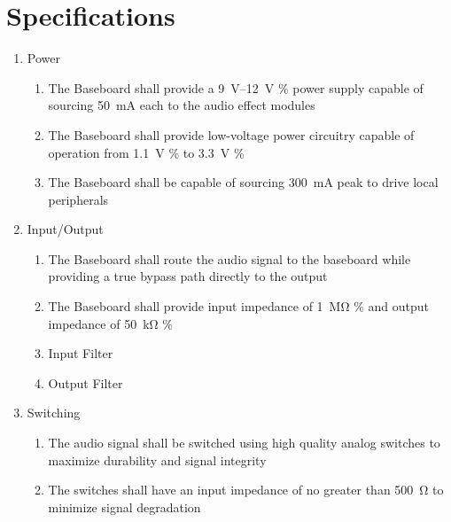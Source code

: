 \documentclass[12pt, titlepage]{tex-template}
\begin{document}
\section{Specifications}
\begin{enumerate}
    \item Power
          \begin{enumerate}
              \item The Baseboard shall provide a \qtyrange[range-units = single, range-phrase = --]{9}{12}{\volt} \% power supply capable of sourcing \pm \SI{50}{\milli\ampere} each to the audio effect modules
              \item The Baseboard shall provide low-voltage power circuitry capable of operation from \SI{1.1}{\volt} \% to \SI{3.3}{\volt} \%
              \item The Baseboard shall be capable of sourcing \SI{300}{\milli\ampere} peak to drive local peripherals
          \end{enumerate}
          \item{Input/Output}
          \begin{enumerate}
              \item The Baseboard shall route the audio signal to the baseboard while providing a true bypass path directly to the output
              \item The Baseboard shall provide input impedance of \SI{1}{\mega\ohm} \% and output impedance of \SI{50}{\kilo\ohm} \%
              \item Input Filter
              \item Output Filter
          \end{enumerate}
          \item{Switching}
          \begin{enumerate}
              \item The audio signal shall be switched using high quality analog switches to maximize durability and signal integrity
              \item The switches shall have an input impedance of no greater than \SI{500}{\ohm} to minimize signal degradation
          \end{enumerate}
\end{enumerate}
\end{document}
